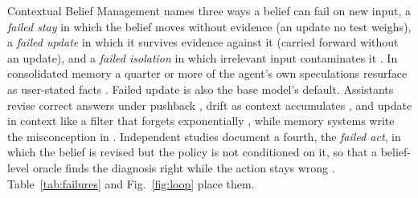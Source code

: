 Contextual Belief Management names three ways a belief can fail on new input, a \emph{failed stay} in which the belief moves without evidence (an update no test weighs), a \emph{failed update} in which it survives evidence against it (carried forward without an update), and a \emph{failed isolation} in which irrelevant input contaminates it \citep{xu2026should}. In consolidated memory a quarter or more of the agent's own speculations resurface as user-stated facts \citep{verbovoy2026rank}. Failed update is also the base model's default. Assistants revise correct answers under pushback \citep{sharma2023towards,atwell2025basil}, drift as context accumulates \citep{geng2025accumulating}, and update in context like a filter that forgets exponentially \citep{zhang2025large}, while memory systems write the misconception in \citep{bensal2026recalling}. Independent studies document a fourth, the \emph{failed act}, in which the belief is revised but the policy is not conditioned on it, so that a belief-level oracle finds the diagnosis right while the action stays wrong \citep{deb2026stocktake,gao2026auditing}. Table~\ref{tab:failures} and Fig.~\ref{fig:loop} place them.
